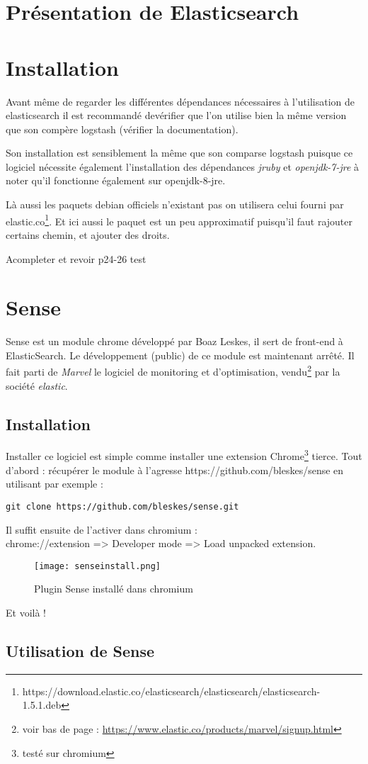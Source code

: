 \section{Présentation de Elasticsearch}


\section{Installation}
Avant même de regarder les différentes dépendances nécessaires à l'utilisation de
elasticsearch il est recommandé devérifier que l'on utilise bien la même version
que son compère logstash (vérifier la documentation).

Son installation est sensiblement la même que son comparse logstash puisque ce logiciel 
nécessite également l'installation des dépendances \emph{jruby} et \emph{openjdk-7-jre}
à noter qu'il fonctionne également sur openjdk-8-jre.

Là aussi les paquets debian officiels n'existant pas on utilisera celui fourni par 
elastic.co\footnote{https://download.elastic.co/elasticsearch/elasticsearch/elasticsearch-1.5.1.deb}.
Et ici aussi le paquet est un peu approximatif puisqu'il faut rajouter certains chemin, et ajouter des droits.




Acompleter et revoir
p24-26
 test


\section{Sense}
Sense est un module chrome développé par Boaz Leskes, il sert de front-end à ElasticSearch.
Le développement (public) de ce module est maintenant arrêté. Il fait parti de 
\emph{Marvel} le logiciel de monitoring et d'optimisation, vendu\footnote{voir bas 
de page : \url{https://www.elastic.co/products/marvel/signup.html}} 
par la société \emph{elastic}.


\subsection{Installation}
Installer ce logiciel est simple comme installer une extension Chrome\footnote{testé sur chromium}
tierce.
Tout d'abord : récupérer le module à l'agresse  https://github.com/bleskes/sense 
en utilisant par exemple : 
\begin{lstlisting}[style=code,label=lst:gitclonesense]
git clone https://github.com/bleskes/sense.git
\end{lstlisting}

Il suffit ensuite de l'activer dans chromium :\\ 
chrome://extension => Developer mode => Load unpacked extension.

\begin{figure}[H]
\center
\texttt{[image: senseinstall.png]}
\label{fig:senseinstall}
\caption{Plugin Sense installé dans chromium}
\end{figure}

Et voilà !

\subsection{Utilisation de Sense}

